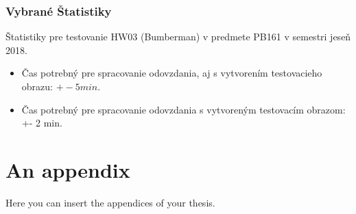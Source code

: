 \documentclass[
  digital, %
  twoside, %
  table,   %
  lof,     %
  lot,     %
]{fithesis3}
\begin{document}
\subsection{Vybrané Štatistiky}

Štatistiky pre testovanie HW03 (Bumberman) v predmete PB161 v semestri jeseň 2018.



\begin{itemize}
    \item Čas potrebný pre spracovanie odovzdania, aj s vytvorením testovacieho obrazu: $+- 5 min$.
    \item Čas potrebný pre spracovanie odovzdania s vytvoreným testovacím obrazom: +- 2 min.
\end{itemize}




\appendix %
\chapter{An appendix}
Here you can insert the appendices of your thesis.
\end{document}
